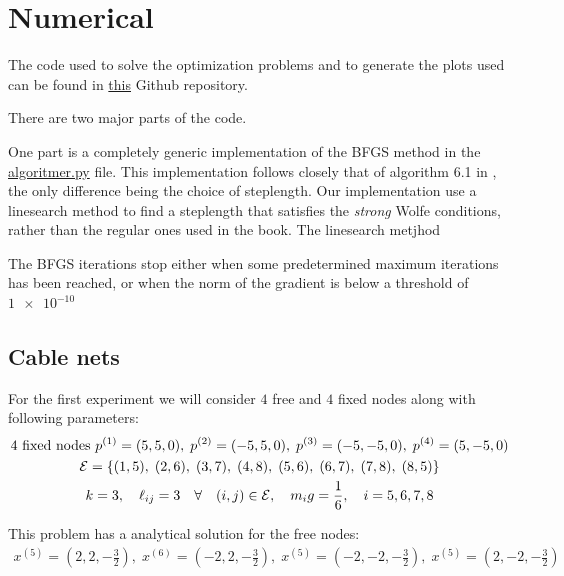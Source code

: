\section{Numerical}
The code used to solve the optimization problems and to generate the plots used can be found in \href{https://github.com/otkulseng/Opt1_Project}{this} Github repository.

There are two major parts of the code. 

One part is a completely generic implementation of the BFGS method in the \href{https://github.com/otkulseng/Opt1_Project/blob/main/Kode/algoritmer.py}{algoritmer.py} file. This implementation follows closely that of algorithm 6.1 in \cite{NW}, the only difference being the choice of steplength. Our implementation use a linesearch method to find a steplength that satisfies the \emph{strong} Wolfe conditions, rather than the regular ones used in the book. The linesearch metjhod

The BFGS iterations stop either when some predetermined maximum iterations has been reached, or when the norm of the gradient is below a threshold of $\num{1e-10}$





\subsection{Cable nets}
For the first experiment we will consider $4$ free and $4$ fixed nodes along with following parameters:
\begin{equation*}
\begin{gathered}
    4 \text{ fixed nodes } p^{(1)} = (5,5,0),\; p^{(2)} = (-5,5,0),\; p^{(3)} = (-5,-5,0),\; p^{(4)} = (5,-5,0) \\
    \mathcal{E} = \{(1,5),\;(2,6),\;(3,7),\;(4,8),\; (5,6),\; (6,7),\; (7,8),\; (8,5) \}\\
    k=3,\quad \ell_{ij} = 3 \quad \forall \quad (i,j) \in \mathcal{E}, \quad m_i g = \frac{1}{6}, \quad i= 5,6,7,8 
\end{gathered}
\end{equation*}

This problem has a analytical solution for the free nodes:
\begin{equation*}
    \begin{gathered}
    x^{(5)} = (2,2,-\frac{3}{2}),\;x^{(6)} = (-2,2,-\frac{3}{2}),\;x^{(5)} = (-2,-2,-\frac{3}{2}),\;x^{(5)} = (2,-2,-\frac{3}{2})
    \end{gathered}
\end{equation*}



